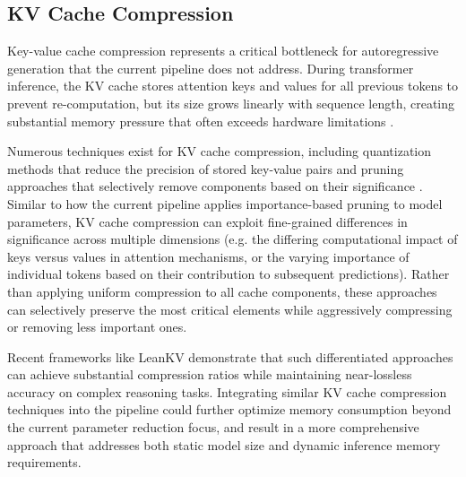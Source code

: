 \subsection{KV Cache Compression}
Key-value cache compression represents a critical bottleneck for autoregressive generation that the current pipeline does not address. During transformer inference, the KV cache stores attention keys and values for all previous tokens to prevent re-computation, but its size grows linearly with sequence length, creating substantial memory pressure that often exceeds hardware limitations \cite{kvcompr}.

Numerous techniques exist for KV cache compression, including quantization methods that reduce the precision of stored key-value pairs and pruning approaches that selectively remove components based on their significance \cite{kvcompr2}. Similar to how the current pipeline applies importance-based pruning to model parameters, KV cache compression can exploit fine-grained differences in significance across multiple dimensions (e.g. the differing computational impact of keys versus values in attention mechanisms, or the varying importance of individual tokens based on their contribution to subsequent predictions). Rather than applying uniform compression to all cache components, these approaches can selectively preserve the most critical elements while aggressively compressing or removing less important ones.

Recent frameworks like LeanKV \cite{kvcompr2} demonstrate that such differentiated approaches can achieve substantial compression ratios while maintaining near-lossless accuracy on complex reasoning tasks. Integrating similar KV cache compression techniques into the pipeline could further optimize memory consumption beyond the current parameter reduction focus, and result in a more comprehensive approach that addresses both static model size and dynamic inference memory requirements.

